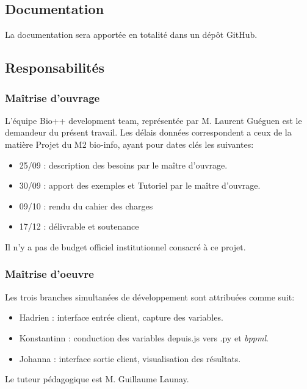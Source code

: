 \subsection{Documentation} 
La documentation sera apportée en totalité dans un dépôt GitHub.

	
\subsection{Responsabilités}
\subsubsection{Maîtrise d'ouvrage}
L'équipe Bio++ development team, représentée par M. Laurent Guéguen est le
 demandeur du présent travail. Les délais données correspondent a ceux de la matière 
 Projet du M2 bio-info, ayant pour dates clés les suivantes:
\begin{itemize}
	\item 25/09 : description des besoins par le maître d'ouvrage.
	\item 30/09 : apport des exemples et Tutoriel par le maître d'ouvrage.
	\item 09/10 : rendu du cahier des charges 
	\item 17/12 : délivrable et soutenance 
\end{itemize}
Il n'y a pas de budget officiel institutionnel consacré à ce projet. 

\subsubsection{Maîtrise d'oeuvre}

Les trois branches simultanées de développement sont attribuées comme suit:

\begin{itemize}
	\item Hadrien : interface entrée client, capture des variables.
	\item Konstantinn : conduction des variables depuis.js vers .py et \textit{bppml}.
	\item Johanna : interface sortie client, visualisation des résultats.
\end{itemize}


Le tuteur pédagogique est M. Guillaume Launay.

%
